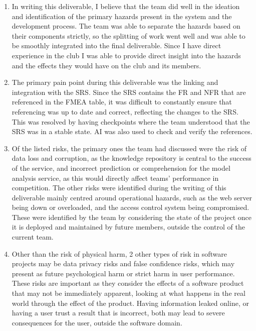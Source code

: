 \documentclass{article}
\begin{document}
\begin{enumerate}
    
    \item In writing this deliverable, I believe that the team did well in the ideation and identification of the primary hazards present 
     in the system and the development process. The team was able to separate the hazards based on their components strictly, so the 
     splitting of work went well and was able to be smoothly integrated into the final deliverable. Since I have direct experience in the club 
     I was able to provide direct insight into the hazards and the effects they would have on the club and its members.

    \item The primary pain point during this deliverable was the linking and integration with the SRS. Since the SRS contains the FR and NFR that 
    are referenced in the FMEA table, it was difficult to constantly ensure that referencing was up to date and correct, reflecting the changes to 
    the SRS. This was resolved by having checkpoints where the team understood that the SRS was in a stable state. AI was also used to check and 
    verify the references.

    \item Of the listed risks, the primary ones the team had discussed were the risk of data loss and corruption, as the knowledge repository is 
    central to the success of the service, and incorrect prediction or comprehension for the model analysis service, as this would directly affect 
    teams' performance in competition. The other risks were identified during the writing of this deliverable mainly centred around operational hazards, 
    such as the web server being down or overloaded, and the access control system being compromised. These were identified by the team by considering 
    the state of the project once it is deployed and maintained by future members, outside the control of the current team.

    \item Other than the risk of physical harm, 2 other types of risk in software projects may be data privacy risks and false confidence risks, which 
    may present as future psychological harm or strict harm in user performance. These risks are important as they consider the effects of 
     a software product that may not be immediately apparent, looking at what happens in the real world through the effect of the product. Having 
    information leaked online, or having a user trust a result that is incorrect, both may lead to severe consequences for the user, outside the 
    software domain.

\end{enumerate}
\end{document}
